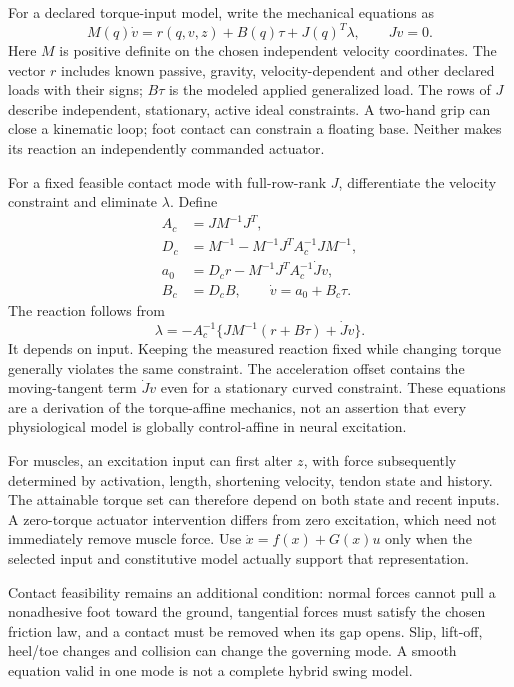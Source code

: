 For a declared torque-input model, write the mechanical equations as
\begin{equation}
M(q)\dot v=r(q,v,z)+B(q)\tau+J(q)^T\lambda,
\qquad Jv=0.
\label{eq:complete_dynamics}
\end{equation}
Here $M$ is positive definite on the chosen independent velocity coordinates. The vector $r$ includes known passive, gravity, velocity-dependent and other declared loads with their signs; $B\tau$ is the modeled applied generalized load. The rows of $J$ describe independent, stationary, active ideal constraints. A two-hand grip can close a kinematic loop; foot contact can constrain a floating base. Neither makes its reaction an independently commanded actuator.

For a fixed feasible contact mode with full-row-rank $J$, differentiate the velocity constraint and eliminate $\lambda$. Define
\begin{equation}
\begin{aligned}
A_c&=JM^{-1}J^T,\\
D_c&=M^{-1}-M^{-1}J^TA_c^{-1}JM^{-1},\\
a_0&=D_cr-M^{-1}J^TA_c^{-1}\dot Jv,\\
B_c&=D_cB,\qquad \dot v=a_0+B_c\tau.
\end{aligned}
\label{eq:complete_reduced}
\end{equation}
The reaction follows from
\begin{equation}
\lambda=-A_c^{-1}\{JM^{-1}(r+B\tau)+\dot Jv\}.
\label{eq:complete_reaction}
\end{equation}
It depends on input. Keeping the measured reaction fixed while changing torque generally violates the same constraint. The acceleration offset contains the moving-tangent term $\dot Jv$ even for a stationary curved constraint. These equations are a derivation of the torque-affine mechanics, not an assertion that every physiological model is globally control-affine in neural excitation.

For muscles, an excitation input can first alter $z$, with force subsequently determined by activation, length, shortening velocity, tendon state and history. The attainable torque set can therefore depend on both state and recent inputs. A zero-torque actuator intervention differs from zero excitation, which need not immediately remove muscle force. Use $\dot x=f(x)+G(x)u$ only when the selected input and constitutive model actually support that representation.

Contact feasibility remains an additional condition: normal forces cannot pull a nonadhesive foot toward the ground, tangential forces must satisfy the chosen friction law, and a contact must be removed when its gap opens. Slip, lift-off, heel/toe changes and collision can change the governing mode. A smooth equation valid in one mode is not a complete hybrid swing model.

